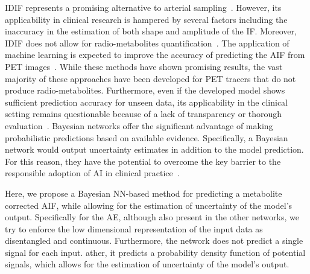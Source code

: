         \gls{IDIF} represents a promising alternative to arterial sampling~\parencite{Zanotti-Fregonara2011}. However, its applicability in clinical research is hampered by several factors including the inaccuracy in the estimation of both shape and amplitude of the \gls{IF}. Moreover, \gls{IDIF} does not allow for radio-metabolites quantification~\parencite{Sari2018Non-invasive11C-SB201745}. The application of machine learning is expected to improve the accuracy of predicting the \gls{AIF} from \gls{PET} images~\parencite{Kuttner2020, Ferrante2022PhysicallyImaging}. While these methods have shown promising results, the vast majority of these approaches have been developed for \gls{PET} tracers that do not produce radio-metabolites. Furthermore, even if the developed model shows sufficient prediction accuracy for unseen data, its applicability in the clinical setting remains questionable because of a lack of transparency or thorough evaluation~\parencite{Salahuddin2022TransparencyMethods}. Bayesian networks offer the significant advantage of making probabilistic predictions based on available evidence. Specifically, a Bayesian network would output uncertainty estimates in addition to the model prediction. For this reason, they have the potential to overcome the key barrier to the responsible adoption of \gls{AI} in clinical practice~\parencite{Prabhudesai2023LoweringAI}. 
        
        Here, we propose a Bayesian \gls{NN}-based method for predicting a metabolite corrected \gls{AIF}, while allowing for the estimation of uncertainty of the model's output. Specifically for the \gls{AE}, although also present in the other networks, we try to enforce the low dimensional representation of the input data as disentangled and continuous. Furthermore, the network does not predict a single signal for each input. ather, it predicts a probability density function of potential signals, which allows for the estimation of uncertainty of the model's output.
        
